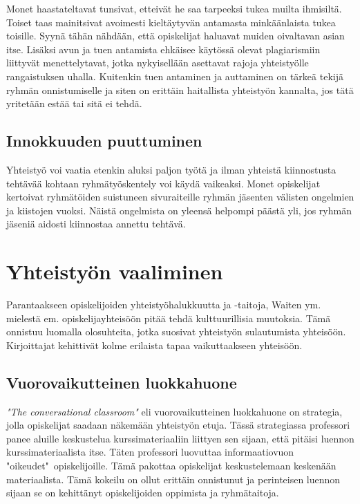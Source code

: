 \documentclass[finnish]{article}
\begin{document}
Monet haastateltavat tunsivat, etteivät he saa tarpeeksi tukea muilta ihmisiltä. Toiset taas mainitsivat avoimesti kieltäytyvän antamasta minkäänlaista tukea toisille. Syynä tähän nähdään, että opiskelijat haluavat muiden oivaltavan asian itse. Lisäksi avun ja tuen antamista ehkäisee käytössä olevat plagiarismiin liittyvät menettelytavat, jotka nykyisellään asettavat rajoja yhteistyölle rangaistuksen uhalla. Kuitenkin tuen antaminen ja auttaminen on tärkeä tekijä ryhmän onnistumiselle ja siten on erittäin haitallista yhteistyön kannalta, jos tätä yritetään estää tai sitä ei tehdä.

\subsection{Innokkuuden puuttuminen}

Yhteistyö voi vaatia etenkin aluksi paljon työtä ja ilman yhteistä kiinnostusta tehtävää kohtaan ryhmätyöskentely voi käydä vaikeaksi. Monet opiskelijat kertoivat ryhmätöiden suistuneen sivuraiteille ryhmän jäsenten välisten ongelmien ja kiistojen vuoksi. Näistä ongelmista on yleensä helpompi päästä yli, jos ryhmän jäseniä aidosti kiinnostaa annettu tehtävä.

\section{Yhteistyön vaaliminen}

Parantaakseen opiskelijoiden yhteistyöhalukkuutta ja -taitoja, Waiten ym. mielestä em. opiskelijayhteisöön pitää tehdä kulttuurillisia muutoksia. Tämä onnistuu luomalla olosuhteita, jotka suosivat yhteistyön sulautumista yhteisöön. Kirjoittajat kehittivät kolme erilaista tapaa vaikuttaakseen yhteisöön.

\subsection{Vuorovaikutteinen luokkahuone}

\emph{"The conversational classroom"} eli vuorovaikutteinen luokkahuone  on strategia, jolla opiskelijat saadaan näkemään yhteistyön etuja. Tässä strategiassa professori panee aluille keskustelua kurssimateriaaliin liittyen sen sijaan, että pitäisi luennon kurssimateriaalista itse. Täten professori luovuttaa informaatiovuon "oikeudet"~opiskelijoille. Tämä pakottaa opiskelijat keskustelemaan keskenään materiaalista. Tämä kokeilu on ollut erittäin onnistunut ja perinteisen luennon sijaan se on kehittänyt opiskelijoiden oppimista ja ryhmätaitoja.
\end{document}
